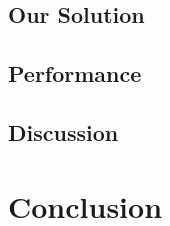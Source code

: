 \documentclass[english,12pt]{article}
\begin{document}
\subsection{Our Solution}


\subsection{Performance}


\subsection{Discussion}


\section{Conclusion}




\end{document}
